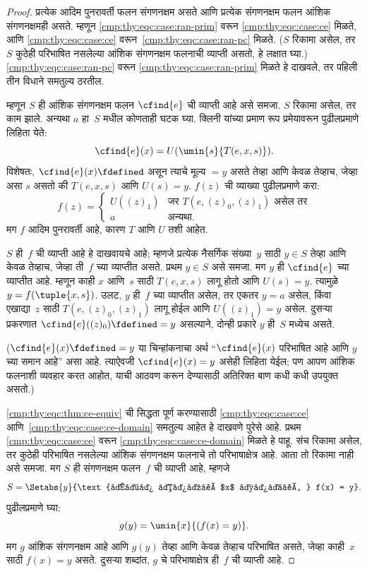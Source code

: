 \begin{proof}
प्रत्येक आदिम पुनरावर्ती फलन संगणनक्षम असते आणि प्रत्येक
संगणनक्षम फलन आंशिक संगणनक्षमही असते. म्हणून
\ref{cmp:thy:eqc:case:ran-prim} वरून \ref{cmp:thy:eqc:case:ce} मिळते, आणि
\ref{cmp:thy:eqc:case:ce} वरून~\ref{cmp:thy:eqc:case:ran-pc} मिळते.
($S$ रिकामा असेल, तर $S$ कुठेही परिभाषित नसलेल्या आंशिक
संगणनक्षम फलनाची व्याप्ती असतो, हे लक्षात घ्या.)
\ref{cmp:thy:eqc:case:ran-pc} वरून \ref{cmp:thy:eqc:case:ran-prim} मिळते हे
दाखवले, तर पहिली तीन विधाने समतुल्य ठरतील.

म्हणून $S$ ही आंशिक संगणनक्षम फलन $\cfind{e}$ ची व्याप्ती आहे
असे समजा. $S$ रिकामा असेल, तर काम झाले. अन्यथा $a$ हा~$S$
मधील कोणताही घटक घ्या. क्लिनी यांच्या प्रमाण रूप प्रमेयावरून
पुढीलप्रमाणे लिहिता येते:
\[\cfind{e}(x) = U(\umin{s}{T(e, x, s)}).
\]
विशेषतः, $\cfind{e}(x) \fdefined$ असून त्याचे मूल्य $= y$ असते तेव्हा
आणि केवळ तेव्हाच, जेव्हा असा $s$ असतो की $T(e, x, s)$ आणि $U(s) = y$.
$f(z)$ ची व्याख्या पुढीलप्रमाणे करा:
\[f(z) = \begin{cases}
  U((z)_1) & \text{जर $T(e, (z)_0, (z)_1)$ असेल तर} \\
  a        & \text{अन्यथा.}
\end{cases}
\]
मग $f$ आदिम पुनरावर्ती आहे, कारण $T$ आणि $U$
तशी आहेत.

$S$ ही~$f$ ची व्याप्ती आहे हे दाखवायचे आहे; म्हणजे प्रत्येक
नैसर्गिक संख्या~$y$ साठी $y \in S$ तेव्हा आणि केवळ तेव्हाच, जेव्हा
ती~$f$ च्या व्याप्तीत असते. प्रथम $y \in S$ असे समजा. मग $y$ ही
$\cfind{e}$ च्या व्याप्तीत आहे. म्हणून काही $x$ आणि~$s$
साठी $T(e,x,s)$ लागू होतो आणि $U(s) = y$. त्यामुळे
$y = f(\tuple{x,s})$. उलट, $y$ ही~$f$ च्या व्याप्तीत
असेल, तर एकतर $y = a$ असेल, किंवा एखाद्या~$z$ साठी
$T(e,(z)_0,(z)_1)$ लागू होईल आणि $U((z)_1) = y$ असेल.
दुसऱ्या प्रकरणात $\cfind{e}((z)_0) \fdefined =
y$ असल्याने, दोन्ही प्रकारे $y$ ही~$S$ मध्येच असते.


($\cfind{e}(x) \fdefined = y$ या चिन्हांकनाचा अर्थ
``$\cfind{e}(x)$ परिभाषित आहे आणि $y$ च्या समान आहे'' असा आहे.
त्याऐवजी $\cfind{e}(x) =
y$ असेही लिहिता येईल; पण आपण आंशिक फलनाशी व्यवहार करत आहोत,
याची आठवण करून देण्यासाठी अतिरिक्त बाण कधी कधी उपयुक्त असतो.)

\ref{cmp:thy:eqc:thm:ce-equiv} ची सिद्धता पूर्ण करण्यासाठी
\ref{cmp:thy:eqc:case:ce} आणि~\ref{cmp:thy:eqc:case:ce-domain} समतुल्य आहेत
हे दाखवणे पुरेसे आहे. प्रथम \ref{cmp:thy:eqc:case:ce} वरून
\ref{cmp:thy:eqc:case:ce-domain} मिळते हे पाहू. संच रिकामा असेल,
तर कुठेही परिभाषित नसलेल्या आंशिक संगणनक्षम फलनाचे तो
परिभाषाक्षेत्र आहे. आता तो रिकामा नाही असे समजा. मग
$S$ ही संगणनक्षम फलन~$f$ ची व्याप्ती आहे, म्हणजे
\[S = \Setabs{y}{\text{अशा काही $x$ साठी, } f(x) = y}.
\]
पुढीलप्रमाणे घ्या:
\[g(y) = \umin{x}{(f(x) = y)}.
\]
मग $g$ आंशिक संगणनक्षम आहे आणि $g(y)$ तेव्हा आणि केवळ तेव्हाच
परिभाषित असते, जेव्हा काही~$x$ साठी $f(x) = y$ असते. दुसऱ्या शब्दांत, $g$
चे परिभाषाक्षेत्र ही~$f$ ची व्याप्ती आहे.




\end{proof}

